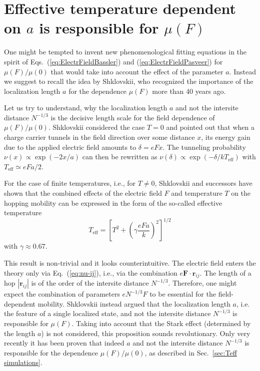 \documentclass[aps,reprint,amsmath,amssymb,superscriptaddress,showpacs,prb]{revtex4-1}
\renewcommand{\alpha}{ a }
\begin{document}
\section{Effective temperature dependent on $a$ is responsible for $\mu(F)$}
\label{sec:Teff}

One might be tempted to invent new phenomenological fitting equations in the spirit of Eqs.~(\ref{eq:ElectrFieldBassler}) and (\ref{eq:ElectrFieldPasveer}) for $\mu(F)/\mu(0)$ that would take into account the effect of the parameter  $\alpha$. Instead we suggest to recall the idea by Shklovskii, who  recognized the importance of the localization length $\alpha$ for the dependence $\mu(F)$ more than 40 years ago\cite{Shklovskii1973}.

Let us try to understand, why the localization length $\alpha$ and not the intersite distance $N^{-1/3}$ is the decisive length scale for the field dependence of $\mu(F)/\mu(0)$. Shklovskii\cite{Shklovskii1973} considered the case $T=0$ and pointed out that when a charge carrier tunnels in the field direction over some distance $x$, its energy gain due to the applied electric field amounts to $\delta = eFx$. The tunneling probability $\nu(x)\propto \exp(-2x/\alpha)$ can then be rewritten as $\nu(\delta)\propto \exp(-\delta/kT_\text{eff})$ with $T_\text{eff} \simeq eF\alpha/2$.

For the case of finite temperatures, i.e., for $T\neq 0$, Shklovskii\cite{Shklovskii1973,Shklovskii1990Fritzsche,Marianer1992} and successors\cite{Hess1993,Cleve1995,Jansson2008PRB} have shown that the combined effects of the electric field $F$ and temperature $T$ on the hopping mobility can be expressed in the form of the so-called effective temperature
\begin {equation}
\label {eq:Teff}
T_\text{eff} = \left[ T^2 + \left(\gamma
\frac{e F \alpha} {k} \right)^2 \right]^{1/2}
\end {equation}
with $\gamma \approx 0.67$.\cite{Marianer1992,Hess1993}

This result is non-trivial and it looks counterintuitive. The electric field enters the theory only via Eq.~(\ref{eq:nu-ij}), i.e., via the combination $e\mathbf{F}\cdot\mathbf{r}_{ij}$.  The length of a hop $|\mathbf{r}_{ij}|$ is of the order of the intersite distance $N^{-1/3}$. Therefore, one might expect the combination of parameters $e N^{-1/3} F$ to be essential for the field-dependent mobility. Shklovskii instead argued \cite{Shklovskii1973} that the localization length $\alpha$, i.e. the feature of a single localized state, and not the intersite distance $N^{-1/3}$ is responsible for $\mu(F)$. Taking into account that the Stark effect (determined by the length $a$) is not considered, this proposition sounds revolutionary. Only very recently it has been proven \cite{Nenashev_ARKHIV2017} that indeed $\alpha$ and not the intersite distance $N^{-1/3}$ is responsible for the dependence $\mu(F)/\mu(0)$, as described in Sec.~\ref{sec:Teff simulations}.
\end{document}
